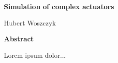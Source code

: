 \thispagestyle{plain}
\begin{center}
    \Large
    \textbf{Simulation of complex actuators}
        
    \vspace{0.4cm}
    \large
    Hubert Woszczyk
    \normalsize
    
    \vspace{0.9cm}
    \textbf{Abstract}
\end{center}
Lorem ipsum dolor...

